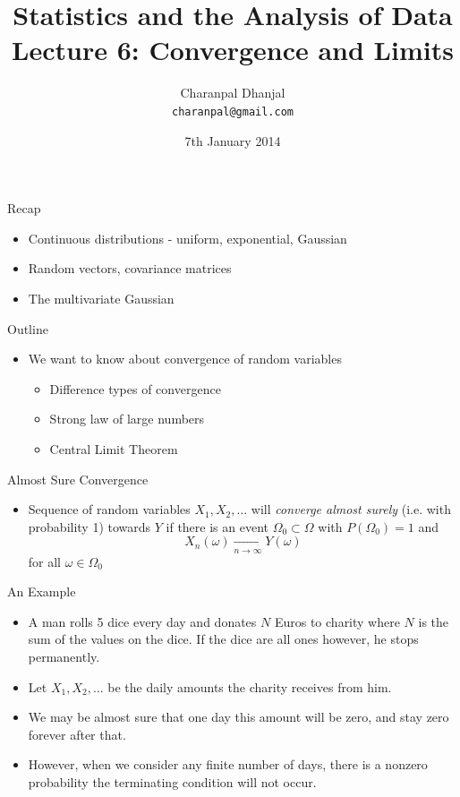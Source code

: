 \documentclass{beamer}
\title{Statistics and the Analysis of Data\\ Lecture 6: Convergence and Limits}
\author{Charanpal Dhanjal \\ \texttt{charanpal@gmail.com}}
\institute{\'{E}cole des Ponts}
\date{7th January 2014}
\begin{document}
\frame{\titlepage}


\begin{frame}{Recap}  
\begin{itemize} 
\item Continuous distributions - uniform, exponential, Gaussian 
\item Random vectors, covariance matrices 
\item The multivariate Gaussian 
\end{itemize}
\end{frame}

\begin{frame}{Outline}  
\begin{itemize} 
 \item We want to know about convergence of random variables 
\begin{itemize}
\item Difference types of convergence 
\item Strong law of large numbers 
\item Central Limit Theorem 
\end{itemize}
\end{itemize}
\end{frame}

\begin{frame}{Almost Sure Convergence}  
\begin{itemize}
 \item Sequence of random variables $X_1, X_2, \ldots$ will \emph{converge almost surely} (i.e. with probability 1) towards $Y$ if there is an event $\Omega_0 \subset \Omega$ with $P(\Omega_0) = 1$ and 
\begin{displaymath}
X_n(\omega) \xrightarrow[n \rightarrow \infty]{} Y(\omega) 
\end{displaymath}
 for all $\omega \in \Omega_0$
\end{itemize}
\end{frame}

\begin{frame}{An Example} 
\begin{itemize}
 \item A man rolls 5 dice every day and donates $N$ Euros to charity where $N$ is the sum of the values on the dice. If the dice are all ones however, he stops permanently.  
 \item Let $X_1, X_2, \ldots$ be the daily amounts the charity receives from him.
 \item We may be almost sure that one day this amount will be zero, and stay zero forever after that.
 \item However, when we consider any finite number of days, there is a nonzero probability the terminating condition will not occur. 
\end{itemize}
\end{frame}
\end{document}
